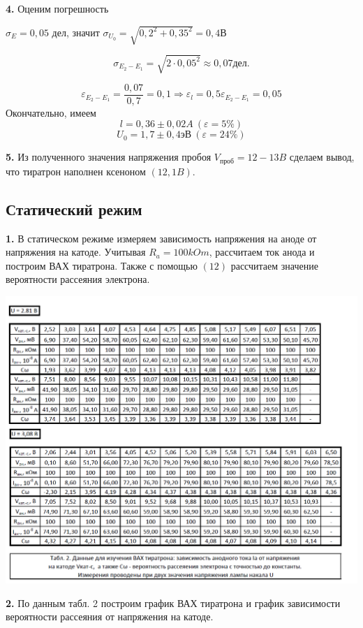 \documentclass[a4paper,12pt]{article}
\newcommand{\eps}{\varepsilon}
\begin{document}
	{\bf 4.} Оценим погрешность
	
	$\sigma_E = 0,05$ дел, значит $\sigma_{U_0} =\sqrt{0,2^2+0,35^2}= 0,4$В
	
	$$\sigma_{E_2 - E_1} = \sqrt{2\cdot 0,05^2} \approx 0,07\text{дел.}$$ 
	
	$$\eps_{E_2 - E_1} = \frac{0,07}{0,7} = 0,1 \Rightarrow \eps_l = 0,5\eps_{E_2 - E_1} = 0,05$$
	Окончательно, имеем
	$$l = 0,36 \pm0,02 A\ (\eps = 5\%)$$
	$$U_0 = 1,7 \pm 0,4 \text{эВ} \ (\eps = 24\%)$$
	
	{\bf 5.} Из полученного значения напряжения пробоя $V_{\text{проб} } = 12-13B$ сделаем вывод, что тиратрон наполнен ксеноном $(12,1B)$.
	
	\subsection{Статический режим}
	{\bf 1.} В статическом режиме измеряем зависимость напряжения на аноде от напряжения на катоде. Учитывая $R_a = 100kOm$, рассчитаем ток анода и построим ВАХ тиратрона. 
	Также с помощью $(12)$ рассчитаем значение вероятности рассеяния электрона.
	
	\includegraphics[width=1.1\linewidth]{tabl2.png}
	 
	 \newpage
	 
	{\bf 2.} По данным табл. 2 построим график ВАХ тиратрона и график зависимости вероятности рассеяния от напряжения на катоде.
	
\end{document}
